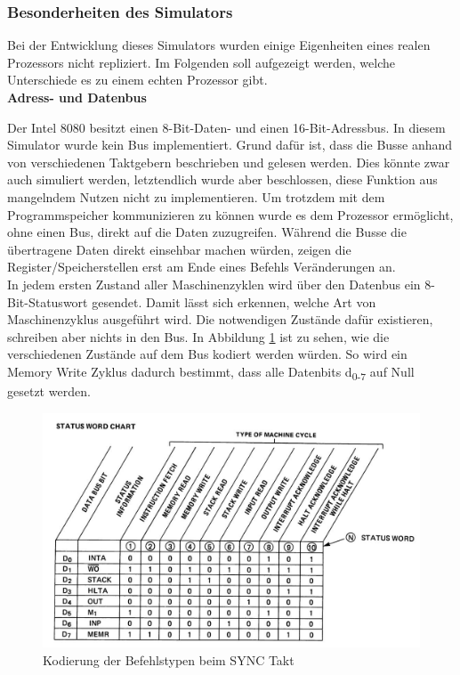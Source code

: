 \documentclass[12pt]{article}
\newcommand{\imgSpaceBefore}{\vspace{10pt}}
\begin{document}
\newpage
\subsubsection{Besonderheiten des Simulators}
Bei der Entwicklung dieses Simulators wurden einige Eigenheiten eines realen Prozessors nicht repliziert. Im Folgenden soll aufgezeigt werden, welche Unterschiede es zu einem echten Prozessor gibt.
\\

\noindent
\textbf{Adress- und Datenbus}

\noindent
Der Intel 8080 besitzt einen 8-Bit-Daten- und einen 16-Bit-Adressbus. 
In diesem Simulator wurde kein Bus implementiert. Grund dafür ist, dass die Busse anhand von verschiedenen Taktgebern beschrieben und gelesen werden. Dies könnte zwar auch simuliert werden, letztendlich wurde aber beschlossen, diese Funktion aus mangelndem Nutzen nicht zu implementieren. Um trotzdem mit dem Programmspeicher kommunizieren zu können wurde es dem Prozessor ermöglicht, ohne einen Bus, direkt auf die Daten zuzugreifen.
Während die Busse die übertragene Daten direkt einsehbar machen würden, zeigen die Register/Speicherstellen erst am Ende eines Befehls Veränderungen an.
\\

\noindent
In jedem ersten Zustand aller Maschinenzyklen wird über den Datenbus ein 8-Bit-Statuswort gesendet. Damit lässt sich erkennen, welche Art von Maschinenzyklus ausgeführt wird.
Die notwendigen Zustände dafür existieren, schreiben aber nichts in den Bus. In Abbildung \ref{fig:status_word} ist zu sehen, wie die verschiedenen Zustände auf dem Bus kodiert werden würden. So wird ein Memory Write Zyklus dadurch bestimmt, dass alle Datenbits d\textsubscript{0-7} auf Null gesetzt werden.

\imgSpaceBefore
\begin{figure}[H]
\centering
\includegraphics[width=13cm]{Bilder/Intel8080_DataLines}
\caption{Kodierung der Befehlstypen beim SYNC Takt \cite{IntMan20}}
\label{fig:status_word}
\end{figure}
\end{document}
